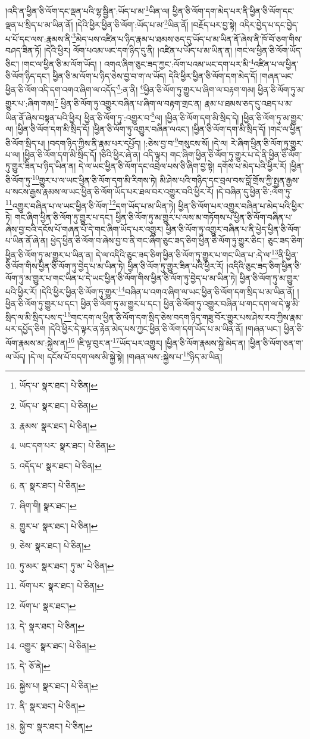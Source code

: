 །འདི་ན་ཕྱིན་ཅི་ལོག་དང་ལྡན་པའི་ལྷ་སྦྱིན་:ཡོད་པ་མ་\footnote{ཡོད་པ་  སྣར་ཐང་།  པེ་ཅིན། }ཡིན་ལ། ཕྱིན་ཅི་ལོག་དག་མེད་པར་ནི་ཕྱིན་ཅི་ལོག་དང་ལྡན་པ་སྲིད་པ་མ་ཡིན་ནོ། །དེའི་ཕྱིར་ཕྱིན་ཅི་ལོག་:ཡོད་པ་མ་\footnote{ཡོད་པ་  སྣར་ཐང་།  པེ་ཅིན། }ཡིན་ནོ། །བརྗོད་པར་བྱ་སྟེ། འདིར་བྱེད་པ་དང་བྱེད་པ་པོ་དང་ལས་:རྣམས་ནི་\footnote{རྣམས་  སྣར་ཐང་།  པེ་ཅིན། }མེད་པས་འཛིན་པ་ཉིད་རྣམ་པ་ཐམས་ཅད་དུ་ཡོད་པ་མ་ཡིན་ནོ་ཞེས་ནི་ཁོ་བོ་ཅག་གིས་བཤད་ཟིན་ཏོ། །དེའི་ཕྱིར། ལོག་པའམ་ཡང་དག་ཉིད་དུ་ནི། །འཛིན་པ་ཡོད་པ་མ་ཡིན་ན། །གང་ལ་ཕྱིན་ཅི་ལོག་ཡོད་ཅིང་། །གང་ལ་ཕྱིན་ཅི་མ་ལོག་ཡོད། །
འགའ་ཞིག་ཅུང་ཟད་ཀྱང་:ལོག་པའམ་ཡང་དག་པར་མི་\footnote{ཡང་དག་པར་  སྣར་ཐང་།  པེ་ཅིན། }འཛིན་པ་ལ་ཕྱིན་ཅི་ལོག་ཉིད་དང་། ཕྱིན་ཅི་མ་ལོག་པ་ཉིད་ཅེས་བྱ་བ་ག་ལ་ཡོད། དེའི་ཕྱིར་ཕྱིན་ཅི་ལོག་དག་མེད་དོ། །གཞན་ཡང་ཕྱིན་ཅི་ལོག་འདི་དག་འགའ་ཞིག་ལ་འདོད་\footnote{འདོད་པ་  སྣར་ཐང་།  པེ་ཅིན། }:ན་ནི། \footnote{ན་  སྣར་ཐང་།  པེ་ཅིན། }ཕྱིན་ཅི་ལོག་ཏུ་གྱུར་པ་ཞིག་ལ་བརྟག་གམ། ཕྱིན་ཅི་ལོག་ཏུ་མ་གྱུར་པ་:ཞིག་གམ།\footnote{ཞིག་གི།  སྣར་ཐང་། } ཕྱིན་ཅི་ལོག་ཏུ་འགྱུར་བཞིན་པ་ཞིག་ལ་བརྟག་གྲང་ན། རྣམ་པ་ཐམས་ཅད་དུ་འཐད་པ་མ་ཡིན་ནོ་ཞེས་བསྟན་པའི་ཕྱིར། ཕྱིན་ཅི་ལོག་ཏུ་:འགྱུར་བ་\footnote{གྱུར་པ་  སྣར་ཐང་།  པེ་ཅིན། }ལ། །ཕྱིན་ཅི་ལོག་དག་མི་སྲིད་དེ། །ཕྱིན་ཅི་ལོག་ཏུ་མ་གྱུར་ལ། །ཕྱིན་ཅི་ལོག་དག་མི་སྲིད་དོ། །ཕྱིན་ཅི་ལོག་ཏུ་འགྱུར་བཞིན་ལའང་། །ཕྱིན་ཅི་ལོག་དག་མི་སྲིད་དོ། །གང་ལ་ཕྱིན་ཅི་ལོག་སྲིད་པ། །བདག་ཉིད་ཀྱིས་ནི་རྣམ་པར་དཔྱོད། །:ཅེས་བྱ་བ་\footnote{ཅེས་  སྣར་ཐང་།  པེ་ཅིན། }གསུངས་སོ། །དེ་ལ། རེ་ཞིག་ཕྱིན་ཅི་ལོག་ཏུ་གྱུར་པ་ལ། །ཕྱིན་ཅི་ལོག་དག་མི་སྲིད་དོ། །ཅིའི་ཕྱིར་ཞེ་ན། འདི་ལྟར། གང་ཞིག་ཕྱིན་ཅི་ལོག་ཏུ་གྱུར་པ་དེ་ནི་ཕྱིན་ཅི་ལོག་ཏུ་གྱུར་ཟིན་པ་ཉིད་ཡིན་ན། དེ་ལ་ཡང་ཕྱིན་ཅི་ལོག་དང་འབྲེལ་པས་ཅི་ཞིག་བྱ་སྟེ། དགོས་པ་མེད་པའི་ཕྱིར་རོ། །ཕྱིན་ཅི་ལོག་ཏུ་\footnote{ཏུ་མར་  སྣར་ཐང་། ཏུ་མ་  པེ་ཅིན། }གྱུར་པ་ལ་ཡང་ཕྱིན་ཅི་ལོག་དག་མི་རིགས་ཏེ། མི་ཤེས་པའི་གཉིད་དང་བྲལ་བས་བློ་གྲོས་ཀྱི་སྤྱན་རྒྱས་པ་སངས་རྒྱས་རྣམས་ལ་ཡང་ཕྱིན་ཅི་ལོག་ཡོད་པར་ཐལ་བར་འགྱུར་བའི་ཕྱིར་རོ། །དེ་བཞིན་དུ་ཕྱིན་ཅི་:ལོག་ཏུ་\footnote{ལོག་པར་  སྣར་ཐང་།  པེ་ཅིན། }འགྱུར་བཞིན་པ་ལ་ཡང་ཕྱིན་ཅི་ལོག་\footnote{ལོག་པ་  སྣར་ཐང་། }དག་ཡོད་པ་མ་ཡིན་ཏེ། ཕྱིན་ཅི་ལོག་པར་འགྱུར་བཞིན་པ་མེད་པའི་ཕྱིར་ཏེ། གང་ཞིག་ཕྱིན་ཅི་ལོག་ཏུ་གྱུར་པ་དང་། ཕྱིན་ཅི་ལོག་ཏུ་མ་གྱུར་པ་ལས་མ་གཏོགས་པ་ཕྱིན་ཅི་ལོག་བཞིན་པ་ཞེས་བྱ་བའི་དངོས་པོ་གཞན་པོ་དེ་གང་ཞིག་ཡོད་པར་འགྱུར། ཕྱིན་ཅི་ལོག་ཏུ་འགྱུར་བཞིན་པ་ནི་ཕྱེད་ཕྱིན་ཅི་ལོག་པ་ཡིན་ནོ་ཞེ་ན། ཕྱེད་ཕྱིན་ཅི་ལོག་བ་ཞེས་བྱ་བ་ནི་གང་ཞིག་ཅུང་ཟད་ཅིག་ཕྱིན་ཅི་ལོག་ཏུ་གྱུར་ཅིང་། ཅུང་ཟད་ཅིག་ཕྱིན་ཅི་ལོག་ཏུ་མ་གྱུར་པ་ཡིན་ན། དེ་ལ་འདིའི་ཅུང་ཟད་ཅིག་ཕྱིན་ཅི་ལོག་ཏུ་གྱུར་པ་གང་ཡིན་པ་:དེ་ལ་\footnote{དེ་  སྣར་ཐང་།  པེ་ཅིན། }ནི་ཕྱིན་ཅི་ལོག་གིས་ཕྱིན་ཅི་ལོག་ཏུ་བྱེད་པ་མ་ཡིན་ཏེ། ཕྱིན་ཅི་ལོག་ཏུ་གྱུར་ཟིན་པའི་ཕྱིར་རོ། །འདིའི་ཅུང་ཟད་ཅིག་ཕྱིན་ཅི་ལོག་ཏུ་མ་གྱུར་པ་གང་ཡིན་པ་དེ་ཡང་ཕྱིན་ཅི་ལོག་གིས་ཕྱིན་ཅི་ལོག་ཏུ་བྱེད་པ་མ་ཡིན་ཏེ། ཕྱིན་ཅི་ལོག་ཏུ་མ་གྱུར་པའི་ཕྱིར་རོ། །དེའི་ཕྱིར་ཕྱིན་ཅི་ལོག་ཏུ་གྱུར་\footnote{འགྱུར་  སྣར་ཐང་།  པེ་ཅིན། }བཞིན་པ་འགའ་ཞིག་ལ་ཡང་ཕྱིན་ཅི་ལོག་དག་སྲིད་པ་མ་ཡིན་ནོ། །ཕྱིན་ཅི་ལོག་ཏུ་གྱུར་པ་དང་། ཕྱིན་ཅི་ལོག་ཏུ་མ་གྱུར་པ་དང་། ཕྱིན་ཅི་ལོག་ཏུ་འགྱུར་བཞིན་པ་གང་དག་ལ་དེ་ལྟ་མི་སྲིད་ལ་མི་སྲིད་པས་ད་\footnote{དེ་  ཅོ་ནེ། }གང་དག་ལ་ཕྱིན་ཅི་ལོག་དག་སྲིད་ཅེས་བདག་ཉིད་གཟུ་བོར་གྱུར་པས་ཤེས་རབ་ཀྱིས་རྣམ་པར་དཔྱོད་ཅིག །དེའི་ཕྱིར་དེ་ལྟར་ན་རྟེན་མེད་པས་ཀྱང་ཕྱིན་ཅི་ལོག་དག་ཡོད་པ་མ་ཡིན་ནོ། །གཞན་ཡང་། ཕྱིན་ཅི་ལོག་རྣམས་མ་:སྐྱེས་ན།\footnote{སྐྱེས་པ།  སྣར་ཐང་།  པེ་ཅིན། } །ཇི་ལྟ་བུར་ན་\footnote{ནི་  སྣར་ཐང་།  པེ་ཅིན། }ཡོད་པར་འགྱུར། །ཕྱིན་ཅི་ལོག་རྣམས་སྐྱེ་མེད་ན། །ཕྱིན་ཅི་ལོག་ཅན་ག་ལ་ཡོད། །དེ་ལ། དངོས་པོ་བདག་ལས་མི་སྐྱེ་སྟེ། །གཞན་ལས་:སྐྱེས་པ་\footnote{སྐྱེ་བ་  སྣར་ཐང་།  པེ་ཅིན། }ཉིད་མ་ཡིན། 